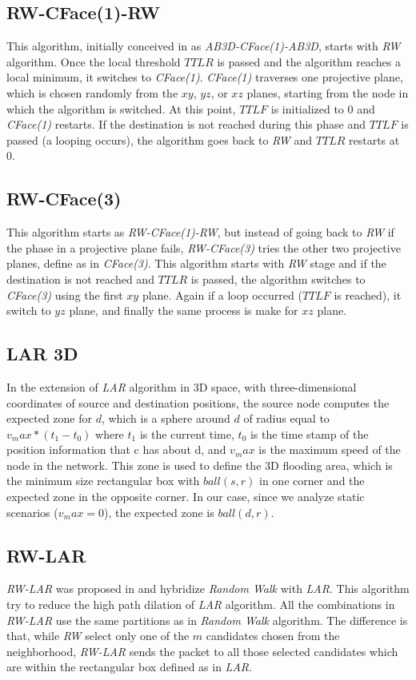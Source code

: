 \documentclass[journal,comsoc]{IEEEtran}
\begin{document}
\subsection{RW-CFace(1)-RW}
This algorithm, initially conceived in \cite{abdallah:random} as \emph{AB3D-CFace(1)-AB3D}, starts with \emph{RW} algorithm. Once the local threshold \(TTLR\) is passed and the algorithm reaches a local minimum, it switches to \emph{CFace(1)}. \emph{CFace(1)} traverses one projective plane, which is chosen randomly from the \(xy\), \(yz\), or \(xz\) planes, starting from the node in which the algorithm is switched. At this point, \(TTLF\) is initialized to 0 and \emph{CFace(1)} restarts. If the destination is not reached during this phase and \(TTLF\) is passed (a looping occurs), the algorithm goes back to \emph{RW} and \(TTLR\) restarts at 0.

\subsection{RW-CFace(3)}
This algorithm starts as \emph{RW-CFace(1)-RW}, but instead of going back to \emph{RW} if the phase in a projective plane fails, \emph{RW-CFace(3)} tries the other two projective planes, define as in \emph{CFace(3)}. This algorithm starts with \emph{RW} stage and if the destination is not reached and \(TTLR\) is passed, the algorithm switches to \emph{CFace(3)} using the first \(xy\) plane. Again if a loop occurred (\(TTLF\) is reached), it switch to \(yz\) plane, and finally the same process is make for \(xz\) plane.

\subsection{LAR 3D}
In the extension of \emph{LAR} algorithm in 3D space, with three-dimensional coordinates of source and destination positions, the source node computes the expected zone for \(d\), which is a sphere around \(d\) of radius equal to \(v_max * (t_1 - t_0)\) where \(t_1\) is the current time, \(t_0\) is the time stamp of the position information that c has about d, and \(v_max\) is the maximum speed of the node in the network. This zone is used to define the 3D flooding area, which is the minimum size rectangular box with \(ball(s,r)\) in one corner and the expected zone in the opposite corner. In our case, since we analyze static scenarios (\(v_max = 0\)), the expected zone is \(ball(d,r)\).

\subsection{RW-LAR}
\emph{RW-LAR} was proposed in \cite{abdallah:high} and hybridize \emph{Random Walk} with \emph{LAR}. This algorithm try to reduce the high path dilation of \emph{LAR} algorithm. All the combinations in \emph{RW-LAR} use the same partitions as in \emph{Random Walk} algorithm. The difference is that, while \emph{RW} select only one of the \(m\) candidates chosen from the neighborhood, \emph{RW-LAR} sends the packet to all those selected candidates which are within the rectangular box defined as in \emph{LAR}.
\end{document}

